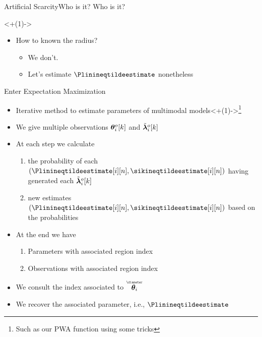 \documentclass[aspectratio=169]{beamer}
\begin{document}
\begin{frame}{Artificial Scarcity}{Who is it? Who is it?}
{\begin{minipage}[t]{.4\linewidth}
    \end{minipage}
\only<+(1)->{
    \begin{minipage}[t]{.55\linewidth}
      \begin{itemize}[<+->]
        \item How to known the radius?
      \begin{itemize}
        \item We don't.
        \item Let's estimate $\Plinineqtildeestimate$ nonetheless
      \end{itemize}
      \end{itemize}
    \end{minipage}
    }
  }
\end{frame}

\begin{frame}{Enter Expectation Maximization}
  \begin{itemize}[<+(1)->]
    \item Iterative method to estimate parameters of multimodal models\onslide<+(1)->{\footnote{Such as our PWA function using some tricks}}
  \end{itemize}

  \begin{itemize}[<+(1)->]
    \item We give multiple observations $\boldsymbol{\theta}_{i}^{o}[k]$ and $\tilde{\boldsymbol{\lambda}}_{i}^{o}[k]$
    \item At each step we calculate
          \begin{enumerate}
            \item[\encircle{E}] the probability of each $(\Plinineqtildeestimate[i][n],\sikineqtildeestimate[i][n])$ having generated each $\tilde{\boldsymbol{\lambda}}_{i}^{o}[k]$
            \item[\encircle{M}] new estimates $(\Plinineqtildeestimate[i][n],\sikineqtildeestimate[i][n])$ based on the probabilities
          \end{enumerate}
  \end{itemize}

  \begin{itemize}[<+(1)->]
    \item At the end we have
          \begin{enumerate}
            \item Parameters with associated region index
            \item Observations with associated region index
          \end{enumerate}
    \item We consult the index associated to $\thetairestricted$
    \item We recover the associated parameter, i.e., $\Plinineqtildeestimate$
  \end{itemize}
\end{frame}
\end{document}
